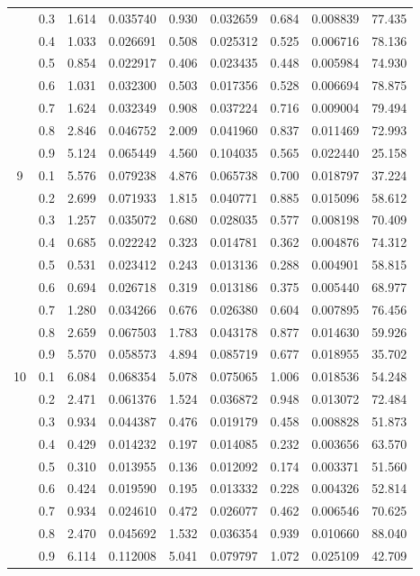 \begin{longtable}{ | c | c || c | c | c | c | c | c | c | }
 & 0.3 & 1.614 & 0.035740 & 0.930 & 0.032659 & 0.684 & 0.008839 & 77.435 \\
 & 0.4 & 1.033 & 0.026691 & 0.508 & 0.025312 & 0.525 & 0.006716 & 78.136 \\
 & 0.5 & 0.854 & 0.022917 & 0.406 & 0.023435 & 0.448 & 0.005984 & 74.930 \\
 & 0.6 & 1.031 & 0.032300 & 0.503 & 0.017356 & 0.528 & 0.006694 & 78.875 \\
 & 0.7 & 1.624 & 0.032349 & 0.908 & 0.037224 & 0.716 & 0.009004 & 79.494 \\
 & 0.8 & 2.846 & 0.046752 & 2.009 & 0.041960 & 0.837 & 0.011469 & 72.993 \\
 & 0.9 & 5.124 & 0.065449 & 4.560 & 0.104035 & 0.565 & 0.022440 & 25.158 \\
 \hline
\multirow{9}{*}{9} & 0.1 & 5.576 & 0.079238 & 4.876 & 0.065738 & 0.700 & 0.018797 & 37.224 \\
 & 0.2 & 2.699 & 0.071933 & 1.815 & 0.040771 & 0.885 & 0.015096 & 58.612 \\
 & 0.3 & 1.257 & 0.035072 & 0.680 & 0.028035 & 0.577 & 0.008198 & 70.409 \\
 & 0.4 & 0.685 & 0.022242 & 0.323 & 0.014781 & 0.362 & 0.004876 & 74.312 \\
 & 0.5 & 0.531 & 0.023412 & 0.243 & 0.013136 & 0.288 & 0.004901 & 58.815 \\
 & 0.6 & 0.694 & 0.026718 & 0.319 & 0.013186 & 0.375 & 0.005440 & 68.977 \\
 & 0.7 & 1.280 & 0.034266 & 0.676 & 0.026380 & 0.604 & 0.007895 & 76.456 \\
 & 0.8 & 2.659 & 0.067503 & 1.783 & 0.043178 & 0.877 & 0.014630 & 59.926 \\
 & 0.9 & 5.570 & 0.058573 & 4.894 & 0.085719 & 0.677 & 0.018955 & 35.702 \\
 \hline
\multirow{9}{*}{10} & 0.1 & 6.084 & 0.068354 & 5.078 & 0.075065 & 1.006 & 0.018536 & 54.248 \\
 & 0.2 & 2.471 & 0.061376 & 1.524 & 0.036872 & 0.948 & 0.013072 & 72.484 \\
 & 0.3 & 0.934 & 0.044387 & 0.476 & 0.019179 & 0.458 & 0.008828 & 51.873 \\
 & 0.4 & 0.429 & 0.014232 & 0.197 & 0.014085 & 0.232 & 0.003656 & 63.570 \\
 & 0.5 & 0.310 & 0.013955 & 0.136 & 0.012092 & 0.174 & 0.003371 & 51.560 \\
 & 0.6 & 0.424 & 0.019590 & 0.195 & 0.013332 & 0.228 & 0.004326 & 52.814 \\
 & 0.7 & 0.934 & 0.024610 & 0.472 & 0.026077 & 0.462 & 0.006546 & 70.625 \\
 & 0.8 & 2.470 & 0.045692 & 1.532 & 0.036354 & 0.939 & 0.010660 & 88.040 \\
 & 0.9 & 6.114 & 0.112008 & 5.041 & 0.079797 & 1.072 & 0.025109 & 42.709 \\
 \hline
\hline
\end{longtable}
 
